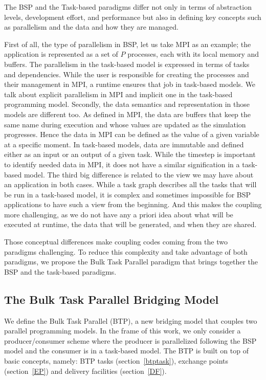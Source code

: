 The BSP and the Task-based paradigms differ not only in terms of abstraction levels, development effort, and performance but also in defining key concepts such as parallelism and the data and how they are managed.

First of all, the type of parallelism in BSP, let us take MPI as an example; the application is represented as a set of $P$ processes, each with its local memory and buffers. The parallelism in the task-based model is expressed in terms of tasks and dependencies. While the user is responsible for creating the processes and their management in MPI, a runtime ensures that job in task-based models. We talk about explicit parallelism in MPI and implicit one in the task-based programming model. 
Secondly, the data semantics and representation in those models are different too. As defined in MPI, the data are buffers that keep the same name during execution and whose values are updated as the simulation progresses. Hence the data in MPI can be defined as the value of a given variable at a specific moment.
In task-based models, data are immutable and defined either as an input or an output of a given task. While the timestep is important to identify needed data in MPI, it does not have a similar signification in a task-based model. 
The third big difference is related to the view we may have about an application in both cases. While a task graph describes all the tasks that will be run in a task-based model, it is complex and sometimes impossible for BSP applications to have such a view from the beginning. And this makes the coupling more challenging, as we do not have any a priori idea about what will be executed at runtime, the data that will be generated, and when they are shared.

Those conceptual differences make coupling codes coming from the two paradigms challenging. To reduce this complexity and take advantage of both paradigms, we propose the Bulk Task Parallel paradigm that brings together the BSP and the task-based paradigms. 


\subsection{The Bulk Task Parallel Bridging Model}\label{sec:btp:btpmdel}

We define the Bulk Task Parallel (BTP), a new bridging model that couples two parallel programming models. In the frame of this work, we only consider a producer/consumer scheme where the producer is parallelized following the BSP model and the consumer is in a task-based model.  The BTP is built on top of basic concepts, namely: BTP tasks (section~\ref{btptask}), exchange points (section~\ref{EP}) and delivery facilities (section~\ref{DF}).  

